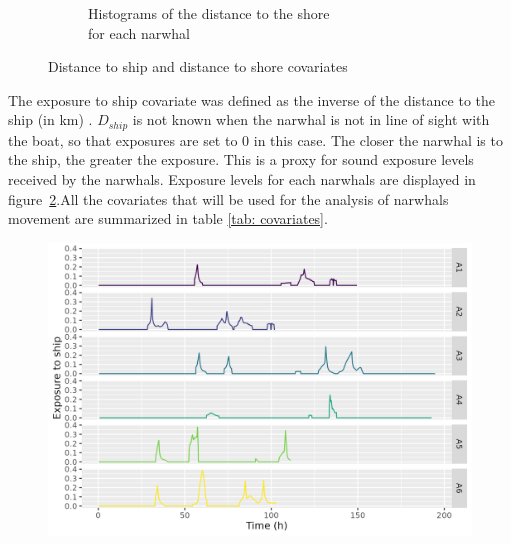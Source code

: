 \documentclass[11pt]{article}
\newcommand {\1}{\mathbb{1}}
\begin{document}
\begin{figure}[H]
\begin{subfigure}{0.48\textwidth}
    \caption{Histograms of the distance to the shore \\ for each narwhal}
    \end{subfigure}
    \caption{Distance to ship and distance to shore covariates}
    \label{fig: distance to shore and distance to ship histograms}
\end{figure}


The exposure to ship covariate was defined as the inverse of the distance to the ship (in km) \cite{heide-jorgensen_behavioral_2021}.
$D_{ship}$ is not known when the narwhal is not in line of sight with the boat, so that exposures are set to $0$ in this case. The closer the narwhal is to the ship, the greater the exposure. This is a proxy for sound exposure levels received by the narwhals. Exposure levels for each narwhals are displayed in figure~\ref{fig: realexpthroughtime}.All the covariates that will be used for the analysis of narwhals movement are summarized in table \ref{tab: covariates}.


\begin{figure}[H]
	\centering
	\includegraphics[width=0.7\linewidth]{images/data_exploration/realExp_through_time}
	\caption{}
	\label{fig: realexpthroughtime}
\end{figure}
\end{document}
